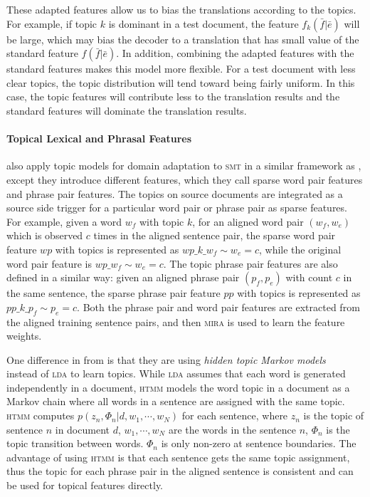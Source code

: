 These adapted features allow us to bias the translations according to
the topics. For example, if topic $k$ is dominant in a test document,
the feature $f_k(\bar{f} | \bar{e})$ will be large, which may bias the
decoder to a translation that has small value of the standard feature
$f(\bar{f}|\bar{e})$. In addition, combining the adapted features with
the standard features makes this model more flexible. For a test
document with less clear topics, the topic distribution will tend
toward being fairly uniform. In this case, the topic features will
contribute less to the translation results and the standard features
will dominate the translation results.

\paragraph{Topical Lexical and Phrasal Features}

\citet{hasler-12} also apply topic models for domain adaptation to
\textsc{smt} in a similar framework as \citet{Eidelman-12}, except
they introduce different features, which they call sparse word pair
features and phrase pair features. The topics on source documents are
integrated as a source side trigger for a particular word pair or
phrase pair as sparse features. For example, given a word $w_f$ with
topic $k$, for an aligned word pair $(w_f, w_e)$ which is observed $c$
times in the aligned sentence pair, the sparse word pair feature $wp$
with topics is represented as $wp\_k\_w_f \sim w_e = c$, while the
original word pair feature is $wp\_w_f \sim w_e = c$. The topic phrase
pair features are also defined in a similar way: given an aligned
phrase pair $(p_f, p_e)$ with count $c$ in the same sentence, the
sparse phrase pair feature $pp$ with topics is represented as
$pp\_k\_p_f \sim p_e = c$. Both the phrase pair and word pair features
are extracted from the aligned training sentence pairs, and then
\textsc{mira} is used to learn the feature weights.

One difference in \citet{hasler-12} from \citet{Eidelman-12} is that
they are using \emph{hidden topic Markov
  models}~\citep[\textsc{htmm}]{gruber-07} instead of \textsc{lda} to
learn topics. While \textsc{lda} assumes that each word is generated
independently in a document, \textsc{htmm} models the word topic in a
document as a Markov chain where all words in a sentence are assigned
with the same topic. \textsc{htmm} computes $p(z_n, \Phi_n | d, w_1,
\cdots, w_N)$ for each sentence, where $z_n$ is the topic of sentence
$n$ in document $d$, $w_1, \cdots, w_N$ are the words in the sentence
$n$, $\Phi_n$ is the topic transition between words. $\Phi_n$ is only
non-zero at sentence boundaries. The advantage of using \textsc{htmm}
is that each sentence gets the same topic assignment, thus the topic
for each phrase pair in the aligned sentence is consistent and can be
used for topical features directly.

